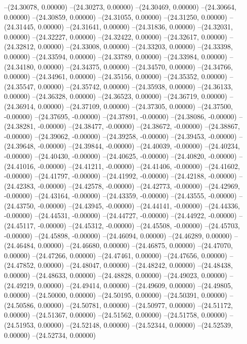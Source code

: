 --(24.30078, 0.00000)
--(24.30273, 0.00000)
--(24.30469, 0.00000)
--(24.30664, 0.00000)
--(24.30859, 0.00000)
--(24.31055, 0.00000)
--(24.31250, 0.00000)
--(24.31445, 0.00000)
--(24.31641, 0.00000)
--(24.31836, 0.00000)
--(24.32031, 0.00000)
--(24.32227, 0.00000)
--(24.32422, 0.00000)
--(24.32617, 0.00000)
--(24.32812, 0.00000)
--(24.33008, 0.00000)
--(24.33203, 0.00000)
--(24.33398, 0.00000)
--(24.33594, 0.00000)
--(24.33789, 0.00000)
--(24.33984, 0.00000)
--(24.34180, 0.00000)
--(24.34375, 0.00000)
--(24.34570, 0.00000)
--(24.34766, 0.00000)
--(24.34961, 0.00000)
--(24.35156, 0.00000)
--(24.35352, 0.00000)
--(24.35547, 0.00000)
--(24.35742, 0.00000)
--(24.35938, 0.00000)
--(24.36133, 0.00000)
--(24.36328, 0.00000)
--(24.36523, 0.00000)
--(24.36719, 0.00000)
--(24.36914, 0.00000)
--(24.37109, 0.00000)
--(24.37305, 0.00000)
--(24.37500, -0.00000)
--(24.37695, -0.00000)
--(24.37891, -0.00000)
--(24.38086, -0.00000)
--(24.38281, -0.00000)
--(24.38477, -0.00000)
--(24.38672, -0.00000)
--(24.38867, -0.00000)
--(24.39062, -0.00000)
--(24.39258, -0.00000)
--(24.39453, -0.00000)
--(24.39648, -0.00000)
--(24.39844, -0.00000)
--(24.40039, -0.00000)
--(24.40234, -0.00000)
--(24.40430, -0.00000)
--(24.40625, -0.00000)
--(24.40820, -0.00000)
--(24.41016, -0.00000)
--(24.41211, -0.00000)
--(24.41406, -0.00000)
--(24.41602, -0.00000)
--(24.41797, -0.00000)
--(24.41992, -0.00000)
--(24.42188, -0.00000)
--(24.42383, -0.00000)
--(24.42578, -0.00000)
--(24.42773, -0.00000)
--(24.42969, -0.00000)
--(24.43164, -0.00000)
--(24.43359, -0.00000)
--(24.43555, -0.00000)
--(24.43750, -0.00000)
--(24.43945, -0.00000)
--(24.44141, -0.00000)
--(24.44336, -0.00000)
--(24.44531, -0.00000)
--(24.44727, -0.00000)
--(24.44922, -0.00000)
--(24.45117, -0.00000)
--(24.45312, -0.00000)
--(24.45508, -0.00000)
--(24.45703, -0.00000)
--(24.45898, -0.00000)
--(24.46094, 0.00000)
--(24.46289, 0.00000)
--(24.46484, 0.00000)
--(24.46680, 0.00000)
--(24.46875, 0.00000)
--(24.47070, 0.00000)
--(24.47266, 0.00000)
--(24.47461, 0.00000)
--(24.47656, 0.00000)
--(24.47852, 0.00000)
--(24.48047, 0.00000)
--(24.48242, 0.00000)
--(24.48438, 0.00000)
--(24.48633, 0.00000)
--(24.48828, 0.00000)
--(24.49023, 0.00000)
--(24.49219, 0.00000)
--(24.49414, 0.00000)
--(24.49609, 0.00000)
--(24.49805, 0.00000)
--(24.50000, 0.00000)
--(24.50195, 0.00000)
--(24.50391, 0.00000)
--(24.50586, 0.00000)
--(24.50781, 0.00000)
--(24.50977, 0.00000)
--(24.51172, 0.00000)
--(24.51367, 0.00000)
--(24.51562, 0.00000)
--(24.51758, 0.00000)
--(24.51953, 0.00000)
--(24.52148, 0.00000)
--(24.52344, 0.00000)
--(24.52539, 0.00000)
--(24.52734, 0.00000)
